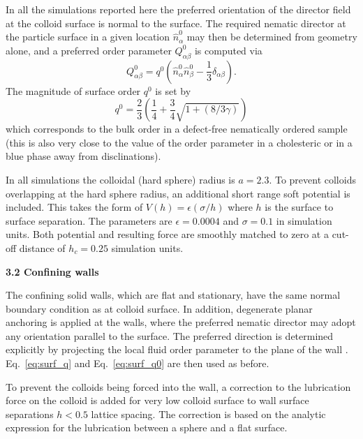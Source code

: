 \documentclass[12pt,twoside]{article}
\begin{document}
In all the simulations reported here the preferred orientation of the
director field at the colloid surface is normal to the surface. The
required nematic director at the particle surface in a given location
$\hat{n}^0_\alpha$ may then be determined from geometry alone,
and a preferred order parameter $Q_{\alpha\beta}^0$ is computed via
\begin{equation}
Q^0_{\alpha\beta} = q^0(\hat{n}_\alpha^0 \hat{n}_\beta^0 
- {\textstyle \frac{1}{3}} \delta_{\alpha\beta}).
\label{eq:surf_q}
\end{equation}
The magnitude of surface order $q^0$ is set by
\begin{equation}
q^0 = {\textstyle \frac{2}{3}} \left( {\textstyle \frac{1}{4}} 
+ {\textstyle \frac{3}{4}} \sqrt{1 + (8/3\gamma)} \right)
\label{eq:surf_q0}
\end{equation}
which corresponds to the bulk order in a defect-free nematically ordered 
sample~\cite{denniston} (this is also very close to the value of the order 
parameter in a cholesteric or in a blue phase away from disclinations).

In all simulations the colloidal (hard sphere) radius is $a = 2.3$. To
prevent colloids overlapping at the hard sphere radius, an additional
short range soft potential is included. This takes the form of
$V(h) = \epsilon (\sigma/h)$ where $h$ is the surface to surface separation.
The parameters are $\epsilon = 0.0004$ and $\sigma = 0.1$ in simulation
units. Both potential and resulting force are smoothly matched to zero at
a cut-off distance of $h_c = 0.25$ simulation units.

{\bf 3.2 Confining walls}

The confining solid walls, which are flat and stationary, have the
same normal boundary condition as at colloid surface. In addition,
degenerate planar anchoring is applied at the walls, where the
preferred nematic director may adopt any orientation parallel
to the surface. The preferred direction is determined explicitly
by projecting the local fluid order parameter to the plane of the
wall \cite{fournier2005}. Eq.~\ref{eq:surf_q} and Eq.~\ref{eq:surf_q0}
are then used as before.

To prevent the colloids being forced into the wall, a correction
to the lubrication force on the colloid is added for very low colloid
surface to wall surface separations $h < 0.5$ lattice spacing. The
correction is based on the analytic expression for the lubrication
between a sphere and a flat surface.
\end{document}
